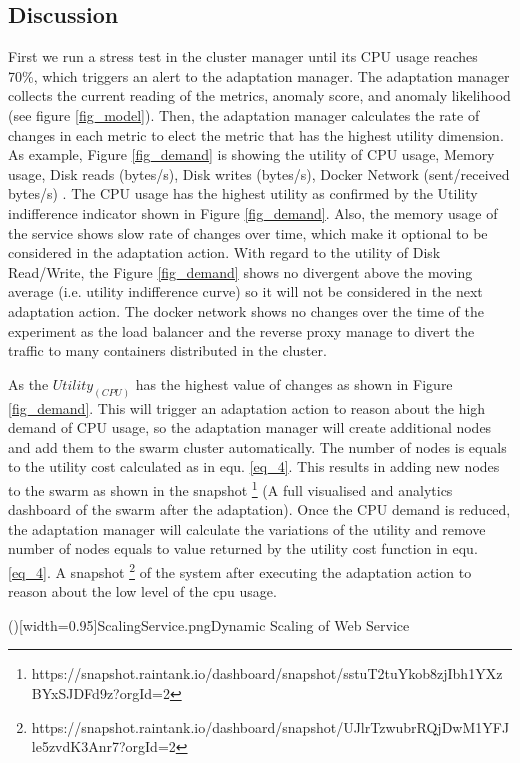 \documentclass{ieeeaccess}
\begin{document}
 \subsection{Discussion}
\label{sec:disc}
First we run a stress test in the cluster manager until its CPU usage reaches 70\%, which triggers an alert to the adaptation manager. The adaptation manager collects the current reading of the metrics, anomaly score, and anomaly likelihood (see figure \ref{fig_model}). Then, the adaptation manager calculates the rate of changes in each metric to elect the metric that has the highest utility dimension. As example, Figure \ref{fig_demand} is showing the utility of CPU usage, Memory usage, Disk reads (bytes/s), Disk writes (bytes/s), Docker Network (sent/received bytes/s) . The CPU usage has the highest utility as confirmed by the Utility indifference indicator shown in Figure \ref{fig_demand}. Also, the memory usage of the service shows slow rate of changes over time, which make it optional to be considered in the adaptation action. With regard to the utility of Disk Read/Write, the Figure \ref{fig_demand} shows no divergent above the moving average (i.e. utility indifference curve) so it will not be considered in the next adaptation action. The docker network shows no changes over the time of the experiment as the load balancer and the reverse proxy manage to divert the traffic to many containers distributed in the cluster.

As the $Utility_(CPU)$ has the highest value of changes as shown in Figure \ref{fig_demand}. This will trigger an adaptation action to reason about the high demand of CPU usage, so the adaptation manager will create additional nodes and add them to the swarm cluster automatically. The number of nodes is equals to the utility cost calculated as in equ. \ref{eq_4}. This results in adding new nodes to the swarm as shown in the snapshot \footnote{https://snapshot.raintank.io/dashboard/snapshot/sstuT2tuYkob8zjIbh1YXzBYxSJDFd9z?orgId=2} (A full visualised and analytics dashboard of the swarm after the adaptation).
Once the CPU demand is reduced, the adaptation manager will calculate the variations of the utility and remove number of nodes equals to value returned by the utility cost function in equ. \ref{eq_4}. A snapshot \footnote{https://snapshot.raintank.io/dashboard/snapshot/UJlrTzwubrRQjDwM1YFJle5zvdK3Anr7?orgId=2} of the system after executing the adaptation action to reason about the low level of the cpu usage. 


\Figure[!t]()[width=0.95\textwidth]{ScalingService.png}{Dynamic Scaling of Web Service \label{fig_Scale}}
   
\end{document}
